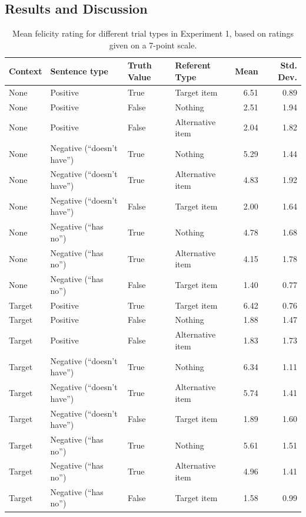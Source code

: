 \documentclass[man, noapacite]{apa2}
\begin{document}
\subsection{Results and Discussion}


\begin{table}
\caption{\label{tab:m1} Mean felicity rating for different trial types in Experiment 1, based on ratings given on a 7-point scale.}
\begin{center}
\small\addtolength{\tabcolsep}{-5pt}
\begin{tabular}{llllrr}
 \hline
 Context & Sentence type & Truth Value & Referent Type & Mean & Std. Dev. \\
 \hline
 None & Positive & True & Target item & 6.51 & 0.89\\
 None & Positive & False & Nothing & 2.51 & 1.94\\
 None & Positive & False & Alternative item & 2.04 & 1.82\\
 None & Negative (``doesn't have'') & True & Nothing & 5.29 & 1.44\\
 None & Negative (``doesn't have'') & True & Alternative item & 4.83 & 1.92\\
 None & Negative (``doesn't have'') & False & Target item & 2.00 & 1.64\\
 None & Negative (``has no'') & True & Nothing & 4.78 & 1.68\\
 None & Negative (``has no'') & True & Alternative item & 4.15 & 1.78\\
 None & Negative (``has no'') & False & Target item & 1.40 & 0.77\\
 Target & Positive & True & Target item & 6.42 & 0.76\\
 Target& Positive & False & Nothing & 1.88 & 1.47\\
 Target & Positive & False & Alternative item & 1.83 & 1.73\\
 Target & Negative (``doesn't have'') & True & Nothing & 6.34 & 1.11\\
 Target & Negative (``doesn't have'') & True & Alternative item & 5.74 & 1.41\\
 Target & Negative (``doesn't have'') & False & Target item & 1.89 & 1.60\\
 Target & Negative (``has no'') & True & Nothing & 5.61 & 1.51\\
 Target & Negative (``has no'') & True & Alternative item & 4.96 & 1.41\\
 Target & Negative (``has no'') & False & Target item & 1.58 & 0.99\\
  \hline
\end{tabular}
\end{center}
\end{table}
\end{document}
